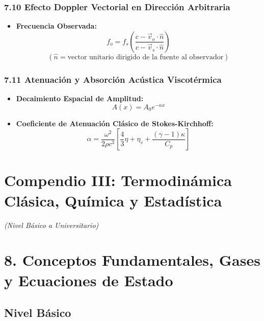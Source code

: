 \documentclass[11pt,a4paper]{article}
\begin{document}
\subsubsection*{7.10 Efecto Doppler Vectorial en Dirección Arbitraria}

\begin{itemize}
  \item \textbf{Frecuencia Observada:}
  \[
    f_o = f_s \left( \frac{c - \vec{v}_o \cdot \hat{n}}{c - \vec{v}_s \cdot \hat{n}} \right)
  \]
  \[
    (\hat{n} = \text{vector unitario dirigido de la fuente al observador})
  \]
\end{itemize}

\subsubsection*{7.11 Atenuación y Absorción Acústica Viscotérmica}

\begin{itemize}
  \item \textbf{Decaimiento Espacial de Amplitud:}
  \[
    A(x) = A_0 e^{-\alpha x}
  \]
  \item \textbf{Coeficiente de Atenuación Clásico de Stokes-Kirchhoff:}
  \[
    \alpha = \frac{\omega^2}{2\rho c^3} \left[ \frac{4}{3}\eta + \eta_v + \frac{(\gamma - 1)\kappa}{C_p} \right]
  \]
\end{itemize}

\section*{Compendio III: Termodinámica Clásica, Química y Estadística}

\textit{(Nivel Básico a Universitario)}

\section*{8. Conceptos Fundamentales, Gases y Ecuaciones de Estado}

\subsection*{Nivel Básico}
\end{document}
